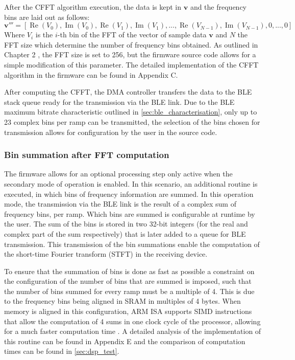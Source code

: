 After the CFFT algorithm execution, the data is kept in $\mathbf{v}$ and the frequency bins are laid out as follows:
\begin{equation}
	\mathbf{v'''} = [\operatorname{Re}(V_0), \operatorname{Im}(V_0),\operatorname{Re}(V_1), \operatorname{Im}(V_1), ..., \operatorname{Re}(V_{N-1}), \operatorname{Im}(V_{N-1}),0,...,0]
\end{equation}
Where $V_i$ is the $i$-th bin of the FFT of the vector of sample data $\mathbf{v}$ and $N$ the FFT size which determine the number of frequency bins obtained. As outlined in Chapter 2 %
, the FFT size is set to 256, but the firmware source code allows for a simple modification of this parameter. The detailed implementation of the CFFT algorithm in the firmware can be found in Appendix C. %

After computing the CFFT, the DMA controller transfers the data to the BLE stack queue ready for the transmission via the BLE link. Due to the BLE maximum bitrate characteristic outlined in \cref{sec:ble_characterisation}, only up to 23 complex bins per ramp can be transmitted, the selection of the bins chosen for transmission allows for configuration by the user in the source code.

\subsubsection{Bin summation after FFT computation}

The firmware allows for an optional processing step only active when the secondary mode of operation is enabled. In this scenario, an additional routine is executed, in which bins of frequency information are summed. In this operation mode, the transmission via the BLE link is the result of a complex sum of frequency bins, per ramp. Which bins are summed is configurable at runtime by the user. The sum of the bins is stored in two 32-bit integers (for the real and complex part of the sum respectively) that is later added to a queue for BLE transmission. This transmission of the bin summations enable the computation of the short-time Fourier transform (STFT) in the receiving device.

To ensure that the summation of bins is done as fast as possible a constraint on the configuration of the number of bins that are summed is imposed, such that the number of bins summed for every ramp must be a multiple of 4. This is due to the frequency bins being aligned in SRAM in multiples of 4 bytes. When memory is aligned in this configuration, ARM ISA supports SIMD instructions that allow the computation of 4 sums in one clock cycle of the processor, allowing for a much faster computation time \cite{ARM2022}. A detailed analysis of the implementation of this routine can be found in Appendix E and the comparison of computation times can be found in \cref{sec:dsp_test}.

